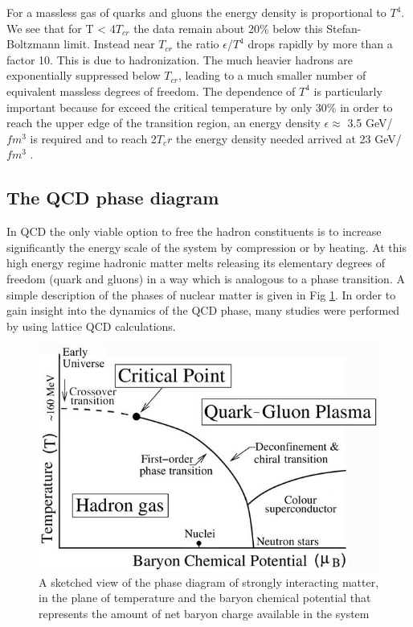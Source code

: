 \documentclass[12pt,a4paper]{book}
\begin{document}
	For a massless gas of quarks and gluons the energy density is proportional to $T^4$.  We see that for T < 4$T_{cr}$ the data remain about 20\% below this Stefan-Boltzmann limit. Instead near $T_{cr}$ the ratio $\epsilon$/$T^4$ drops rapidly by more than a factor 10. This is due to hadronization. The much heavier hadrons are exponentially suppressed below $T_{cr}$, leading to a much smaller number of equivalent massless degrees of freedom. The dependence of $T^4$ is particularly important because for exceed the critical temperature by only 30\% in order to reach the upper edge of the transition region, an energy density $\epsilon \approx$  3.5 GeV/$fm^3$ is required and to reach 2$T_cr$ the energy density needed arrived at 23 GeV/$fm^3$ \cite{heinz2004conceptsheavyionphysics}.
	
	\subsection{The QCD phase diagram}
	In QCD the only viable option to free the hadron constituents is to increase significantly the energy scale of the system by compression or by heating. At this high energy regime hadronic matter melts releasing its elementary degrees of freedom (quark and gluons) in a way which is analogous to a phase transition. A simple description of the phases of nuclear matter is given in Fig \ref{fig:QCD_phase_diagram}. In order to gain insight into the dynamics of the QCD phase, many studies were performed by using lattice QCD	calculations. 
	\begin{figure}[ht]
		\centering
		\includegraphics[width=0.7\linewidth]{pictures/QCD_phase_diagram.jpg}
		\caption{A sketched view of the phase diagram of strongly interacting matter, in the plane of temperature and the baryon chemical potential that represents the amount of net baryon charge available in the system}
		\label{fig:QCD_phase_diagram} 
	\end{figure}
\end{document}
